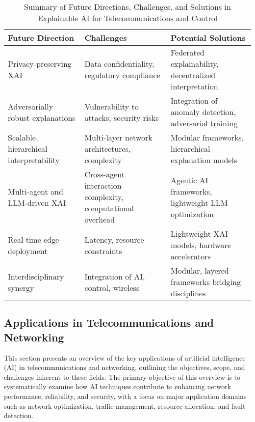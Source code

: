 \documentclass[sigconf]{acmart}
\begin{document}
\begin{table*}[htbp]
\centering
\caption{Summary of Future Directions, Challenges, and Solutions in Explainable AI for Telecommunications and Control}
\label{tab:future-directions}
\begin{adjustbox}{max width=\textwidth}
\begin{tabular}{@{}lll@{}}
\toprule
\textbf{Future Direction} & \textbf{Challenges} & \textbf{Potential Solutions} \\ \midrule
Privacy-preserving XAI & Data confidentiality, regulatory compliance & Federated explainability, decentralized interpretation~\cite{ref48} \\
Adversarially robust explanations & Vulnerability to attacks, security risks & Integration of anomaly detection, adversarial training~\cite{ref50, ref54} \\
Scalable, hierarchical interpretability & Multi-layer network architectures, complexity & Modular frameworks, hierarchical explanation models~\cite{ref55} \\
Multi-agent and LLM-driven XAI & Cross-agent interaction complexity, computational overhead & Agentic AI frameworks, lightweight LLM optimization~\cite{ref55} \\
Real-time edge deployment & Latency, resource constraints & Lightweight XAI models, hardware accelerators~\cite{ref54} \\
Interdisciplinary synergy & Integration of AI, control, wireless & Modular, layered frameworks bridging disciplines \\ \bottomrule
\end{tabular}
\end{adjustbox}
\end{table*}

\subsection{Applications in Telecommunications and Networking}

This section presents an overview of the key applications of artificial intelligence (AI) in telecommunications and networking, outlining the objectives, scope, and challenges inherent to these fields. The primary objective of this overview is to systematically examine how AI techniques contribute to enhancing network performance, reliability, and security, with a focus on major application domains such as network optimization, traffic management, resource allocation, and fault detection.
\end{document}
